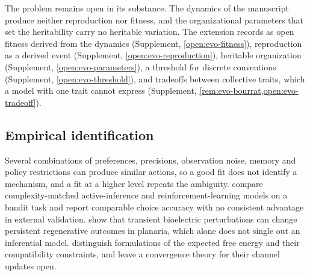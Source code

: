 The problem remains open in its substance. The dynamics of the manuscript produce neither reproduction nor fitness, and the organizational parameters that set the heritability carry no heritable variation. The extension records as open fitness derived from the dynamics (Supplement, \cref{open:evo-fitness}), reproduction as a derived event (Supplement, \cref{open:evo-reproduction}), heritable organization (Supplement, \cref{open:evo-parameters}), a threshold for discrete conventions (Supplement, \cref{open:evo-threshold}), and tradeoffs between collective traits, which a model with one trait cannot express (Supplement, \cref{rem:evo-bourrat,open:evo-tradeoff}).

\subsection{Empirical identification}\label{sec:opn-10}

Several combinations of preferences, precisions, observation noise, memory and policy restrictions can produce similar actions, so a good fit does not identify a mechanism, and a fit at a higher level repeats the ambiguity. \citet{chou2026systematic} compare complexity-matched active-inference and reinforcement-learning models on a bandit task and report comparable choice accuracy with no consistent advantage in external validation. \citet{durant2017long} show that transient bioelectric perturbations can change persistent regenerative outcomes in planaria, which alone does not single out an inferential model. \citet{champion2026reframing} distinguish formulations of the expected free energy and their compatibility constraints, and \citet{nuijten2026type} leave a convergence theory for their channel updates open.

